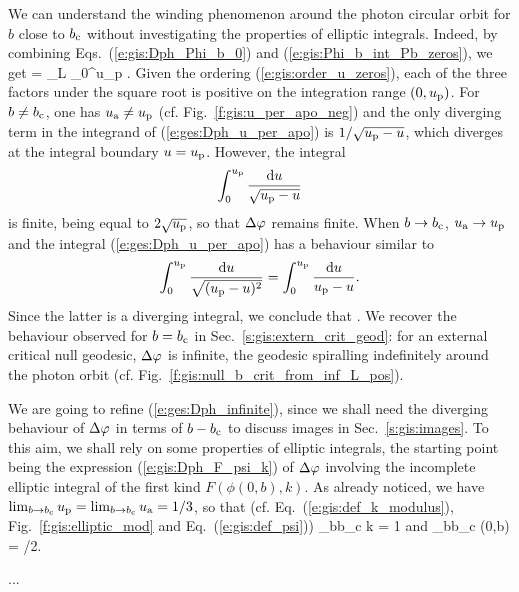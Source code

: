 We can understand the winding phenomenon
around the photon circular orbit for $b$ close to $b_{\rm c}$
without investigating the properties of elliptic integrals.
Indeed, by combining Eqs.~(\ref{e:gis:Dph_Phi_b_0}) and (\ref{e:gis:Phi_b_int_Pb_zeros}),
we get
\be \label{e:ges:Dph_u_per_apo}
    \Delta\ph = \eps_L  \int_0^{u_{\rm p}}
     .
\ee
Given the ordering (\ref{e:gis:order_u_zeros}), each of the
three factors under the square root is positive on the integration range
$(0,u_{\rm p})$. For $b\not=b_{\rm c}$, one has $u_{\rm a}\not=u_{\rm p}$
(cf. Fig.~\ref{f:gis:u_per_apo_neg})
and
the only diverging term in the integrand of (\ref{e:ges:Dph_u_per_apo})
is $1/\sqrt{u_{\rm p} - u}$, which
diverges at the integral boundary $u=u_{\rm p}$. However, the integral
\[
    \int_0^{u_{\rm p}}
    \frac{\mathrm{d} u}{\sqrt{u_{\rm p} - u}}
\]
is finite, being equal to $2\sqrt{u_{\rm p}}$, so that $\Delta\varphi$ remains
finite. When $b\to b_{\rm c}$,
$u_{\rm a} \to u_{\rm p}$ and the integral (\ref{e:ges:Dph_u_per_apo})
has a behaviour similar to
\[
     \int_0^{u_{\rm p}}
    \frac{\mathrm{d} u}{\sqrt{(u_{\rm p} - u)^2}} = \int_0^{u_{\rm p}}
    \frac{\mathrm{d} u}{u_{\rm p} - u} .
\]
Since the latter is a diverging integral, we conclude that
\be \label{e:ges:Dph_infinite}
    .
\ee
We recover the behaviour observed for $b=b_{\rm c}$ in
Sec.~\ref{s:gis:extern_crit_geod}: for
an external critical null geodesic,
$\Delta\varphi$ is infinite, the geodesic spiralling indefinitely around the
photon orbit (cf. Fig.~\ref{f:gis:null_b_crit_from_inf_L_pos}).

We are going to refine (\ref{e:ges:Dph_infinite}), since we shall
need the diverging behaviour of $\Delta\varphi$ in terms
of $b - b_{\rm c}$ to discuss images in Sec.~\ref{s:gis:images}.
To this aim, we shall rely on some properties of
elliptic integrals, the starting point being the expression
(\ref{e:gis:Dph_F_psi_k}) of $\Delta\varphi$ involving the incomplete elliptic
integral of the first kind $F(\phi(0,b), k)$. As already noticed, we
have $\lim_{b\to b_{\rm c}} u_{\rm p} = \lim_{b\to b_{\rm c}} u_{\rm a} = 1/3$,
so that (cf. Eq.~(\ref{e:gis:def_k_modulus}), Fig.~\ref{f:gis:elliptic_mod}
and Eq.~(\ref{e:gis:def_psi}))
\be
    \lim_{b\to b_{\rm c}} k = 1 \qquad\mbox{and}\qquad
    \lim_{b\to b_{\rm c}} \phi(0,b) = \pi/2.
\ee

...

